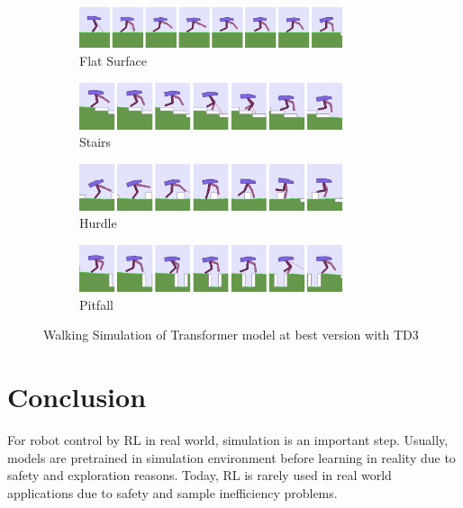 \documentclass[a4paper, 12pt]{article} %
\begin{document}
\begin{figure}[!ht]
	\centering
	\begin{subfigure}{.9\textwidth}
		\centering
		\includegraphics[width=0.85\textwidth]{figures/bipedal/anim/trsf_flat.png}
		\caption{Flat Surface}
		\label{fig:anim_trsf_flat}
	\end{subfigure}
	\begin{subfigure}{.9\textwidth}
		\centering
		\includegraphics[width=0.85\textwidth]{figures/bipedal/anim/trsf_stairs.png}
		\caption{Stairs}
		\label{fig:anim_trsf_stairs}
	\end{subfigure}
	\begin{subfigure}{.9\textwidth}
		\centering
		\includegraphics[width=0.85\textwidth]{figures/bipedal/anim/trsf_hurdle.png}
		\caption{Hurdle}
		\label{fig:anim_trsf_hurdle}
	\end{subfigure}
	\begin{subfigure}{.9\textwidth}
		\centering
		\includegraphics[width=0.85\textwidth]{figures/bipedal/anim/trsf_pitfall.png}
		\caption{Pitfall}
		\label{fig:anim_trsf_pitfall}
	\end{subfigure}
	\caption{Walking Simulation of Transformer model at best version with TD3}
	\label{fig:trsf_simulation}
\end{figure}

\section{Conclusion}

For robot control by RL in real world, simulation is an important step. 
Usually, models are pretrained in simulation environment before learning in reality due to safety and exploration reasons. 
Today, RL is rarely used in real world applications due to safety and sample inefficiency problems. 
\end{document}
